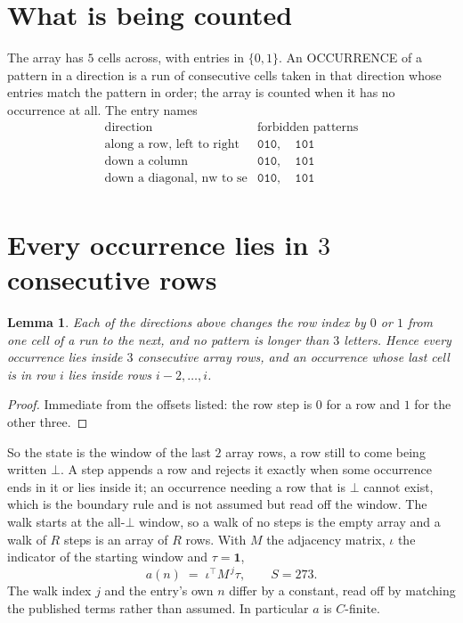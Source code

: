 \documentclass[11pt,a4paper]{article}
\theoremstyle{plain}
\newtheorem{lemma}[theorem]{Lemma}
\theoremstyle{definition}
\begin{document}
\section{What is being counted}

The array has $5$ cells across, with entries in $\{0,1\}$. An OCCURRENCE of a pattern in a
direction is a run of consecutive cells taken in that direction whose entries match the pattern
in order; the array is counted when it has no occurrence at all. The entry names
\[
\begin{array}{ll}
\text{direction} & \text{forbidden patterns} \\[2pt]
\text{along a row, left to right} & \mathtt{010},\quad \mathtt{101} \\
\text{down a column} & \mathtt{010},\quad \mathtt{101} \\
\text{down a diagonal, nw to se} & \mathtt{010},\quad \mathtt{101} \\
\end{array}
\]


\section{Every occurrence lies in $3$ consecutive rows}

\begin{lemma}\label{lem:win}
Each of the directions above changes the row index by $0$ or $1$ from one cell of a run to the
next, and no pattern is longer than $3$ letters. Hence every occurrence lies inside $3$
consecutive array rows, and an occurrence whose last cell is in row $i$ lies inside rows
$i-2,\dots,i$.
\end{lemma}

\begin{proof}
Immediate from the offsets listed: the row step is $0$ for a row and $1$ for the other three.
\end{proof}

So the state is the window of the last $2$ array rows, a row still to come being written
$\bot$. A step appends a row and rejects it exactly when some occurrence ends in it or lies
inside it; an occurrence needing a row that is $\bot$ cannot exist, which is the boundary rule
and is not assumed but read off the window. The walk starts at the all-$\bot$ window, so a walk
of no steps is the empty array and a walk of $R$ steps is an array of $R$ rows. With $M$ the
adjacency matrix, $\iota$ the indicator of the starting window and $\tau=\mathbf{1}$,
\[
a(n)\;=\;\iota^{\!\top}M^{\,j}\tau ,\qquad S=273.
\]
The walk index $j$ and the entry's own $n$ differ by a constant, read off by matching the
published terms rather than assumed. In particular $a$ is $C$-finite.
\end{document}
